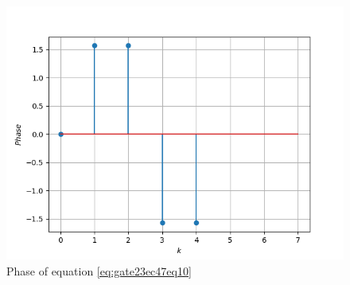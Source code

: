 \documentclass[journal,12pt,onecolumn]{IEEEtran}
\theoremstyle{remark}
\begin{document}
\begin{enumerate}
\begin{figure}[h!]
    \includegraphics[width=\columnwidth]{2023/EC/47/figs/mm21.png}
    \caption{Phase of equation \eqref{eq:gate23ec47eq10}}
    \label{fig:gate23ec47fig4}
\end{figure}

\end{enumerate}

\end{document}
